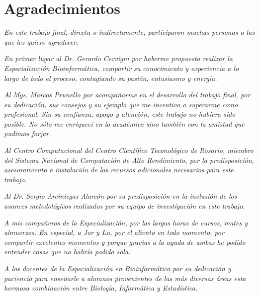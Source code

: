 
\chapter*{Agradecimientos}
\begin{spacing}{1}

\emph{En este trabajo final, directa o indirectamente, participaron muchas personas a las que les quiero agradecer.}

\emph{En primer lugar al Dr. Gerardo Cervigni por haberme propuesto realizar la Especialización Bioinformática, compartir su conocimiento y experiencia a lo largo de todo el proceso, contagiando su pasión, entusiasmo y energía. }

\emph{Al Mgs. Marcos Prunello por acompañarme en el desarrollo del trabajo final, por su dedicación, sus consejos y su ejemplo que me incentiva a superarme como profesional. Sin su confianza, apoyo y atención, este trabajo no hubiera sido posible. No sólo me enriquecí en lo académico sino también con la amistad que pudimos forjar. }

\emph{Al Centro Computacional del Centro Científico Teconológico de Rosario, miembro del Sistema Nacional de Computación de Alto Rendimiento, por la predisposición, asesoramiento e instalación de los recursos adicionales necesarios para este trabajo. }

\emph{Al Dr. Sergio Arciniegas Alarcón por su predisposición en la inclusión de los avances metodológicos realizados por su equipo de investigación en este trabajo.}

\emph{A mis compañeros de la Especialización, por las largas horas de cursos, mates y almuerzos. En especial, a Jor y Lu, por el aliento en todo momento, por compartir excelentes momentos y porque gracias a la ayuda de ambas he podido entender cosas que no habría podido sola.}

\emph{A los docentes de la Especialización en Bioinformática por su dedicación y paciencia para enseñarle a alumnos provenientes de las más diversas áreas esta hermosa combinación entre Biología, Informática y Estadística.}


\end{spacing}
